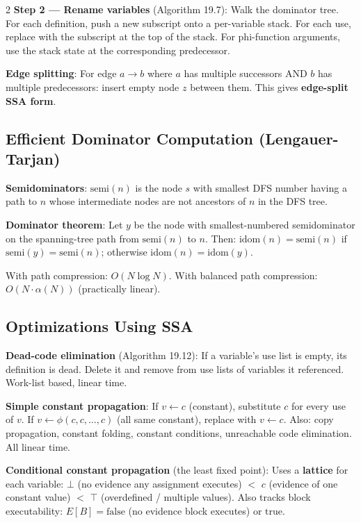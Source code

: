 \documentclass[9pt,landscape]{extarticle}
\begin{document}
\begin{multicols}{2}
\textbf{Step 2 --- Rename variables} (Algorithm 19.7): Walk the dominator tree. For each definition, push a new subscript onto a per-variable stack. For each use, replace with the subscript at the top of the stack. For phi-function arguments, use the stack state at the corresponding predecessor.

\textbf{Edge splitting}: For edge $a \to b$ where $a$ has multiple successors AND $b$ has multiple predecessors: insert empty node $z$ between them. This gives \textbf{edge-split SSA form}.

\subsection{Efficient Dominator Computation (Lengauer-Tarjan)}

\textbf{Semidominators}: $\text{semi}(n)$ is the node $s$ with smallest DFS number having a path to $n$ whose intermediate nodes are not ancestors of $n$ in the DFS tree.

\textbf{Dominator theorem}: Let $y$ be the node with smallest-numbered semidominator on the spanning-tree path from $\text{semi}(n)$ to $n$. Then: $\text{idom}(n) = \text{semi}(n)$ if $\text{semi}(y) = \text{semi}(n)$; otherwise $\text{idom}(n) = \text{idom}(y)$.

With path compression: $O(N \log N)$. With balanced path compression: $O(N \cdot \alpha(N))$ (practically linear).

\subsection{Optimizations Using SSA}

\textbf{Dead-code elimination} (Algorithm 19.12): If a variable's use list is empty, its definition is dead. Delete it and remove from use lists of variables it referenced. Work-list based, linear time.

\textbf{Simple constant propagation}: If $v \leftarrow c$ (constant), substitute $c$ for every use of $v$. If $v \leftarrow \phi(c, c, \ldots, c)$ (all same constant), replace with $v \leftarrow c$. Also: copy propagation, constant folding, constant conditions, unreachable code elimination. All linear time.

\textbf{Conditional constant propagation} (the least fixed point): Uses a \textbf{lattice} for each variable: $\bot$ (no evidence any assignment executes) $<$ $c$ (evidence of one constant value) $<$ $\top$ (overdefined / multiple values). Also tracks block executability: $E[B] = \text{false}$ (no evidence block executes) or $\text{true}$.


\end{multicols}
\end{document}
